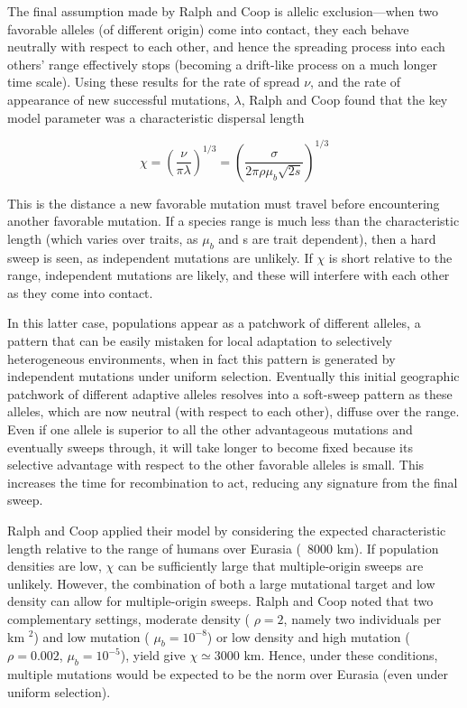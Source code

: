 \documentclass{article}
\begin{document}
The final assumption made by Ralph and Coop is allelic exclusion—when two favorable alleles (of different origin) come into contact, they each behave neutrally with respect to each other, and hence the spreading process into each others' range effectively stops (becoming a drift-like process on a much longer time scale). Using these results for the rate of spread  $ \nu $, and the rate of appearance of new successful mutations,  $ \lambda $, Ralph and Coop found that the key model parameter was a characteristic dispersal length

\begin{equation}
\chi=\left(\frac{\nu}{\pi\lambda}\right)^{1/3}=\left(\frac{\sigma}{2\pi\rho\mu_{b}\sqrt{2s}}\right)^{1/3}
\tag{8.23}
\label{eq:8_23}
\end{equation}

This is the distance a new favorable mutation must travel before encountering another favorable mutation. If a species range is much less than the characteristic length (which varies over traits, as  $ \mu_b $ and s are trait dependent), then a hard sweep is seen, as independent mutations are unlikely. If  $ \chi $ is short relative to the range, independent mutations are likely, and these will interfere with each other as they come into contact.

In this latter case, populations appear as a patchwork of different alleles, a pattern that can be easily mistaken for local adaptation to selectively heterogeneous environments, when in fact this pattern is generated by independent mutations under uniform selection. Eventually this initial geographic patchwork of different adaptive alleles resolves into a soft-sweep pattern as these alleles, which are now neutral (with respect to each other), diffuse over the range. Even if one allele is superior to all the other advantageous mutations and eventually sweeps through, it will take longer to become fixed because its selective advantage with respect to the other favorable alleles is small. This increases the time for recombination to act, reducing any signature from the final sweep.

Ralph and Coop applied their model by considering the expected characteristic length relative to the range of humans over Eurasia (~8000 km). If population densities are low,  $ \chi $ can be sufficiently large that multiple-origin sweeps are unlikely. However, the combination of both a large mutational target and low density can allow for multiple-origin sweeps. Ralph and Coop noted that two complementary settings, moderate density ( $ \rho = 2 $, namely two individuals per km $ ^2 $) and low mutation ( $ \mu_b = 10^{-8} $) or low density and high mutation ( $ \rho = 0.002 $,  $ \mu_b = 10^{-5} $), yield give  $ \chi \simeq 3000 $ km. Hence, under these conditions, multiple mutations would be expected to be the norm over Eurasia (even under uniform selection).
\end{document}
